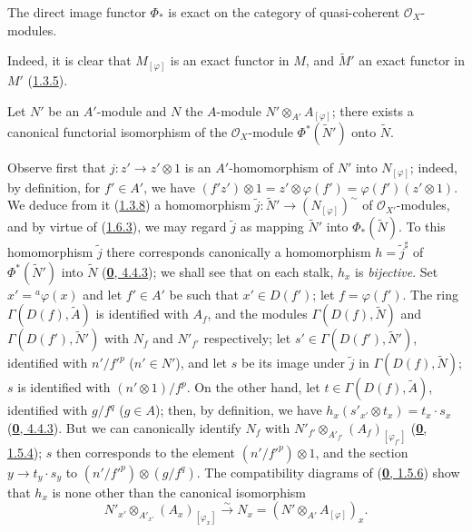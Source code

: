 \begin{corollary}[1.6.4]
\label{I.1.6.4}
The direct image functor $\Phi_*$ is exact on the category of
quasi-coherent $\mathscr{O}_X$-modules.
\end{corollary}

Indeed, it is clear that $M_{[\varphi]}$ is an exact functor in $M$, and
$\widetilde{M}'$ an exact functor in $M'$ (\hyperref[I.1.3.5]{1.3.5}).

\begin{proposition}[1.6.5]
\label{I.1.6.5}
Let $N'$ be an $A'$-module and $N$ the $A$-module
$N'\otimes_{A'}A_{[\varphi]}$; there exists a canonical functorial
isomorphism of the $\mathscr{O}_X$-module $\Phi^*(\widetilde{N}')$ onto
$\widetilde{N}$.
\end{proposition}

Observe first that $j:z'\to z'\otimes 1$ is an
$A'$-homomorphism of $N'$ into $N_{[\varphi]}$; indeed, by definition,
for $f'\in A'$, we have
$(f'z')\otimes 1=z'\otimes\varphi(f')=\varphi(f')(z'\otimes 1)$. We
deduce from it (\hyperref[I.1.3.8]{1.3.8}) a homomorphism
$\widetilde{j}:\widetilde{N}'\to(N_{[\varphi]})^{\sim}$ of
$\mathscr{O}_{X'}$-modules, and by virtue of
(\hyperref[I.1.6.3]{1.6.3}), we may regard $\widetilde{j}$ as
mapping $\widetilde{N}'$ into $\Phi_*(\widetilde{N})$. To this homomorphism
$\widetilde{j}$ there corresponds canonically a homomorphism
$h=\widetilde{j}^{\sharp}$ of $\Phi^*(\widetilde{N}')$ into $\widetilde{N}$
(\hyperref[0.4.4.3]{\textbf{0}, 4.4.3}); we shall see that on each stalk,
$h_x$ is \emph{bijective}. Set $x'={}^a\varphi(x)$ and let $f'\in A'$ be
such that $x'\in D(f')$; let $f=\varphi(f')$. The ring
$\Gamma(D(f),\widetilde{A})$ is identified with $A_f$, and the modules
$\Gamma(D(f),\widetilde{N})$ and $\Gamma(D(f'),\widetilde{N}')$ with $N_f$
and $N'_{f'}$ respectively; let
$s'\in\Gamma(D(f'),\widetilde{N}')$, identified with $n'/{f'}^p$
($n'\in N'$), and let $s$ be its image under $\widetilde{j}$ in
$\Gamma(D(f),\widetilde{N})$; $s$ is identified with $(n'\otimes 1)/f^p$.
On the other hand, let $t\in\Gamma(D(f),\widetilde{A})$, identified with
$g/f^q$ ($g\in A$); then, by definition, we have
$h_x(s'_{x'}\otimes t_x)=t_x\cdot s_x$
(\hyperref[0.4.4.3]{\textbf{0}, 4.4.3}). But we can canonically identify
$N_f$ with
$N'_{f'}\otimes_{A'_{f'}}(A_f)_{[\varphi_{f'}]}$
(\hyperref[0.1.5.4]{\textbf{0}, 1.5.4}); $s$ then corresponds to the element
$(n'/{f'}^p)\otimes 1$, and the section $y\to t_y\cdot s_y$ to
$(n'/{f'}^p)\otimes(g/f^q)$. The compatibility diagrams of
(\hyperref[0.1.5.6]{\textbf{0}, 1.5.6}) show that $h_x$ is none other than
the canonical isomorphism
\[
  \label{I.1.6.5.1}
  N'_{x'}\otimes_{A'_{x'}}(A_x)_{[\varphi_x]}
  \xrightarrow{\sim}N_x=(N'\otimes_{A'}A_{[\varphi]})_x.
  \tag{1.6.5.1}
\]

